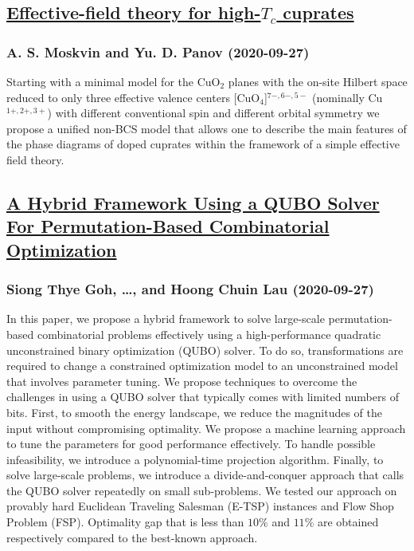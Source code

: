 \subsection*{\href{http://arxiv.org/abs/2009.12790v1}{Effective-field theory for high-$T_c$ cuprates}}
\subsubsection*{A. S. Moskvin and Yu. D. Panov (2020-09-27)}
Starting with a minimal model for the CuO$_2$ planes with the on-site Hilbert
space reduced to only three effective valence centers [CuO$_4$]$^{7-,6-,5-}$
(nominally Cu$^{1+,2+,3+}$) with different conventional spin and different
orbital symmetry we propose a unified non-BCS model that allows one to describe
the main features of the phase diagrams of doped cuprates within the framework
of a simple effective field theory.

\subsection*{\href{http://arxiv.org/abs/2009.12767v1}{A Hybrid Framework Using a QUBO Solver For Permutation-Based  Combinatorial Optimization}}
\subsubsection*{Siong Thye Goh, \dots, and Hoong Chuin Lau (2020-09-27)}
In this paper, we propose a hybrid framework to solve large-scale
permutation-based combinatorial problems effectively using a high-performance
quadratic unconstrained binary optimization (QUBO) solver. To do so,
transformations are required to change a constrained optimization model to an
unconstrained model that involves parameter tuning. We propose techniques to
overcome the challenges in using a QUBO solver that typically comes with
limited numbers of bits. First, to smooth the energy landscape, we reduce the
magnitudes of the input without compromising optimality. We propose a machine
learning approach to tune the parameters for good performance effectively. To
handle possible infeasibility, we introduce a polynomial-time projection
algorithm. Finally, to solve large-scale problems, we introduce a
divide-and-conquer approach that calls the QUBO solver repeatedly on small
sub-problems. We tested our approach on provably hard Euclidean Traveling
Salesman (E-TSP) instances and Flow Shop Problem (FSP). Optimality gap that is
less than $10\%$ and $11\%$ are obtained respectively compared to the
best-known approach.

